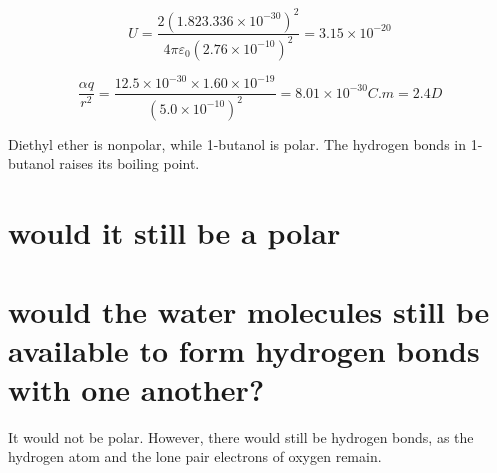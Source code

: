 \documentclass[answers]{exam}
\begin{document}
\begin{questions}

\begin{solution}
	$$U = \frac{2\left(1.823.336\times10^{-30}\right)^2}{4\pi\varepsilon_0\left(2.76\times10^{-10}\right)^2} = 3.15\times10^{-20}$$
\end{solution}


\begin{solution}
	$$\frac{\alpha q}{r^2} = \frac{12.5\times10^{-30}\times1.60\times10^{-19}}{\left(5.0\times10^{-10}\right)^2} = 8.01\times10^{-30}\si{C.m} = 2.4\si{D}$$
\end{solution}


\begin{solution}
	Diethyl ether is nonpolar, while 1-butanol is polar. The hydrogen bonds in 1-butanol raises its boiling point.
\end{solution}


\begin{parts}
	\part{would it still be a polar}
	\part{would the water molecules still be available to form hydrogen bonds with one another?}
\end{parts}

\begin{solution}
	It would not be polar. However, there would still be hydrogen bonds, as the hydrogen atom and the lone pair electrons of oxygen remain.
\end{solution}


\end{questions}
\end{document}
